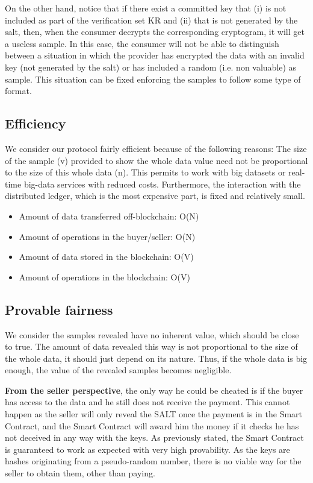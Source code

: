 \documentclass[]{article}
\begin{document}
	On the other hand, notice that if there exist a committed key that (i) is not included as part of the verification set KR and (ii) that is not generated by the salt, then, when the consumer decrypts the corresponding cryptogram, it will get a useless sample. In this case, the consumer will not be able to distinguish between a situation in which the provider has encrypted the data with an invalid key (not generated by the salt) or has included a random (i.e.  non valuable) as sample. This situation can be fixed enforcing the samples to follow some type of format.

	\subsection {Efficiency}
	We consider our protocol fairly efficient because of the following reasons: The size of the sample (v) provided to show the whole data value need not be proportional to the size of this whole data (n). This permits to work with big datasets or real-time big-data services with reduced costs. Furthermore, the interaction with the distributed ledger, which is the most expensive part, is fixed and relatively small.
	\begin{itemize}
		\item Amount of data transferred off-blockchain: O(N)
		\item Amount of operations in the buyer/seller: O(N)
		\item Amount of data stored in the blockchain: O(V)
		\item Amount of operations in the blockchain: O(V)
	\end{itemize}
	
	\subsection{Provable fairness}
	We consider the samples revealed have no inherent value, which should be close to true. The amount of data revealed this way is not proportional to the size of the whole data, it should just depend on its nature. Thus, if the whole data is big enough, the value of the revealed samples becomes negligible.
	
	\textbf{From the seller perspective}, the only way he could be cheated is if the buyer has access to the data and he still does not receive the payment. This cannot happen as the seller will only reveal the SALT once the payment is in the Smart Contract, and the Smart Contract will award him the money if it checks he has not deceived in any way with the keys. As previously stated, the Smart Contract is guaranteed to work as expected with very high provability. As the keys are hashes originating from a pseudo-random number, there is no viable way for the seller to obtain them, other than paying.
\end{document}
